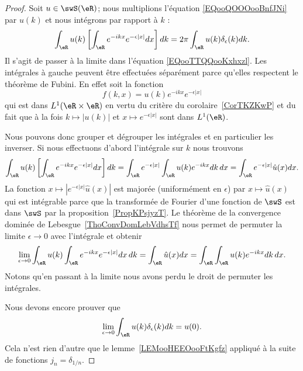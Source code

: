 \begin{proof}
	Soit \( u\in\swS(\eR)\); nous multiplions l'équation \eqref{EQooQOOOooBnfJNi} par \( u(k)\) et nous intégrons par rapport à \( k\) :
	\begin{equation}        \label{EQooTTQQooKxhxzl}
		\int_{\eR}u(k)\left[ \int_{\eR} e^{-ikx} e^{-\epsilon| x |}dx \right]dk=2\pi\int_{\eR}u(k)\delta_{\epsilon}(k)dk.
	\end{equation}
	Il s'agit de passer à la limite dans l'équation \eqref{EQooTTQQooKxhxzl}. Les intégrales à gauche peuvent être effectuées séparément parce qu'elles respectent le théorème de Fubini. En effet soit la fonction
	\begin{equation}
		f(k,x)=u(k) e^{-ikx} e^{-\epsilon| x |}
	\end{equation}
	qui est dans \( L^1(\eR\times \eR)\) en vertu du critère du corolaire~\ref{CorTKZKwP} et du fait que à la fois \( k\mapsto | u(k) | \) et \( x\mapsto  e^{-\epsilon| x |}\) sont dans \( L^1(\eR)\).

	Nous pouvons donc grouper et dégrouper les intégrales et en particulier les inverser. Si nous effectuons d'abord l'intégrale sur \( k\) nous trouvons
	\begin{equation}
		\int_{\eR}u(k)\left[ \int_{\eR} e^{-ikx} e^{-\epsilon| x |}dx \right]dk=\int_{\eR} e^{-\epsilon| x |}\int_{\eR}u(k) e^{-ikx}dk\,dx=\int_{\eR} e^{-\epsilon| x |}\hat u(x)dx.
	\end{equation}
	La fonction \( x\mapsto |  e^{-\epsilon| x |}\hat u(x) |\) est majorée (uniformément en \( \epsilon\)) par \( x\mapsto \hat u(x)\) qui est intégrable parce que la transformée de Fourier d'une fonction de \( \swS\) est dans \( \swS\) par la proposition~\ref{PropKPsjyzT}. Le théorème de la convergence dominée de Lebesgue~\ref{ThoConvDomLebVdhsTf} nous permet de permuter la limite \( \epsilon\to 0 \) avec l'intégrale et obtenir
	\begin{equation}
		\lim_{\epsilon\to 0}\int_{\eR}u(k)\int_{\eR} e^{-ikx} e^{-\epsilon| x |}dx\,dk=\int_{\eR}\hat u(x)dx=\int_{\eR}\int_{\eR}u(k) e^{-ikx}dk\,dx.
	\end{equation}
	Notons qu'en passant à la limite nous avons perdu le droit de permuter les intégrales.

	Nous devons encore prouver que
	\begin{equation}
		\lim_{\epsilon\to 0}\int_{\eR}u(k)\delta_{\epsilon}(k)dk=u(0).
	\end{equation}
	Cela n'est rien d'autre que le lemme~\ref{LEMooHEEOooFtKgfz} appliqué à la suite de fonctions \( j_n=\delta_{1/n}\).
\end{proof}

